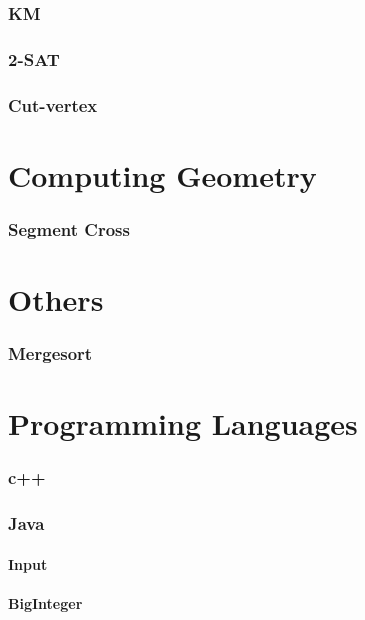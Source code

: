 \documentclass[a4paper, twocolumn, landscape]{article}
\begin{document}
\section{KM}

\section{2-SAT}

\section{Cut-vertex}


\part{Computing Geometry}
\section{Segment Cross}


\part{Others}
\section{Mergesort}


\part{Programming Languages}
\section{c++}


\section{Java}
\subsection*{Input}

\subsection*{BigInteger}

\end{document}
